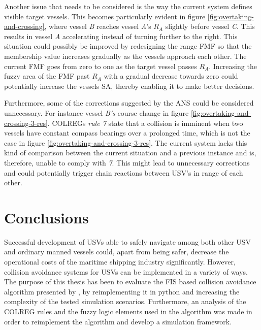 Another issue that needs to be considered is the way the current system defines visible target vessels. This becomes particularly evident in figure \ref{fig:overtaking-and-crossing}, where vessel \textit{B} reaches vessel \textit{A}'s $R_A$ slightly before vessel \textit{C}. This results in vessel \textit{A} accelerating instead of turning further to the right. This situation could possibly be improved by redesigning the range FMF so that the membership value increases gradually as the vessels approach each other. The current FMF goes from zero to one as the target vessel passes $R_A$. Increasing the fuzzy area of the FMF past $R_A$ with a gradual decrease towards zero could potentially increase the vessels SA, thereby enabling it to make better decisions.

Furthermore, some of the corrections suggested by the ANS could be considered unnecessary. For instance vessel \textit{B's} course change in figure \ref{fig:overtaking-and-crossing-3-res}. COLREGs \textit{rule 7} state that a collision is imminent when two vessels have constant compass bearings over a prolonged time, which is not the case in figure \ref{fig:overtaking-and-crossing-3-res}. The current system lacks this kind of comparison between the  current situation and a previous instance and is, therefore, unable to comply with \textit{7}. This might lead to unnecessary corrections and could potentially trigger chain reactions between USV's in range of each other.


\chapter{Conclusions}%
\label{chap:conc}

Successful development of USVs able to safely navigate among both other USV and ordinary manned vessels could, apart from being safer,  decrease the operational costs of the maritime shipping industry significantly. However, collision avoidance systems for USVs can be implemented in a variety of ways. The purpose of this thesis has been to evaluate the FIS based collision avoidance algorithm presented by \textcite{perera2012intelligent,perera2010smooth_param}, by reimplementing it in python and increasing the complexity of the tested simulation scenarios. Furthermore, an analysis of the COLREG rules and the fuzzy logic elements used in the algorithm was made in order to reimplement the algorithm and  develop a simulation framework.


